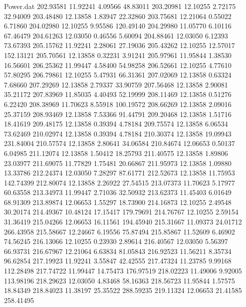\begin{filecontents}{Power.dat}
 202.93581   11.92241    4.09566   48.83011
 203.20981   12.10255    2.72175   32.94009
 203.48480   12.13858    1.83947   22.32860
 203.75681   12.21064    0.55022    6.71860
 204.02980   12.10255    9.95586  120.49140
 204.29980   11.05770    6.10116   67.46479
 204.61263   12.03050    0.46556    5.60094
 204.88461   12.03050    6.12393   73.67393
 205.15762   11.92241    2.28061   27.19036
 205.43262   12.10255   12.57017  152.13121
 205.70561   12.13858    0.32231    3.91241
 205.97961   11.95844    1.38530   16.56601
 206.25362   11.99447    4.58400   54.98258
 206.52661   12.10255    4.77610   57.80295
 206.79861   12.10255    5.47931   66.31361
 207.02069   12.13858    0.63324    7.68660
 207.29269   12.13858    2.79337   33.90759
 207.56468   12.13858    2.90081   35.21172
 207.83969   11.85035    4.40493   52.19999
 208.11469   12.13858    0.51276    6.22420
 208.38969   11.70623    8.55918  100.19572
 208.66269   12.13858    2.09016   25.37159
 208.93469   12.13858    7.53366   91.44791
 209.20468   12.13858    1.51716   18.41619
 209.48175   12.13858    0.39394    4.78184
 209.75574   12.13858    6.06534   73.62469
 210.02974   12.13858    0.39394    4.78184
 210.30374   12.13858   19.09943  231.84004
 210.57574   12.13858    2.80641   34.06584
 210.84674   12.06653    0.50137    6.04985
 211.12074   12.13858    1.50412   18.25793
 211.40575   12.13858    1.89806   23.03977
 211.69075   11.77829    1.75481   20.66867
 211.95973   12.13858    1.09880   13.33786
 212.24374   12.03050    7.28297   87.61771
 212.52673   12.13858   11.75953  142.74399
 212.80074   12.13858    2.26922   27.54515
 213.07373   11.70623    5.17977   60.63558
 213.34973   11.99447    2.71036   32.50932
 213.62373   11.45403    6.01649   68.91309
 213.89874   12.06653    1.55297   18.73900
 214.16873   12.10255    2.49548   30.20174
 214.49367   10.48124   17.15417  179.79691
 214.76767   12.10255    2.59154   31.36419
 215.04266   12.06653   16.11561  194.45940
 215.31667   11.09373   24.01712  266.43958
 215.58667   12.24667    6.19556   75.87494
 215.85867   11.52609    6.46902   74.56245
 216.13066   12.10255    0.23930    2.89614
 216.40567   12.03050    5.56397   66.93731
 216.67967   12.21064    6.63834   81.05843
 216.92523   11.56211    8.35734   96.62854
 217.19923   11.92241    3.55847   42.42555
 217.47324   11.23785    9.99168  112.28498
 217.74722   11.99447   14.75473  176.97519
 218.02223   11.49006    9.92005  113.98196
 218.29623   12.03050    4.83468   58.16363
 218.56723   11.95844    1.57575   18.84349
 218.84023   11.38197   25.35522  288.59235
 219.11324   12.06653   21.41585  258.41495

\end{filecontents}

